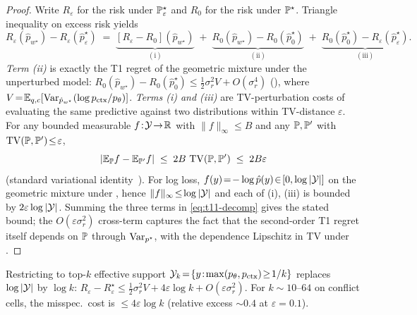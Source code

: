 \begin{proof}
Write $R_\varepsilon$ for the risk under $\mathbb{P}^\star_\varepsilon$ and
$R_0$ for the risk under $\mathbb{P}^\star$.  Triangle inequality on excess
risk yields
\begin{equation}
R_\varepsilon(\hat p_{w^\star})\!-\!R_\varepsilon(\hat p^\star_\varepsilon)
\;=\;\underbrace{[R_\varepsilon\!-\!R_0](\hat p_{w^\star})}_{(\textrm{i})}
\;+\;\underbrace{R_0(\hat p_{w^\star})\!-\!R_0(\hat p^\star_0)}_{(\textrm{ii})}
\;+\;\underbrace{R_0(\hat p^\star_0)\!-\!R_\varepsilon(\hat p^\star_\varepsilon)}_{(\textrm{iii})}.
\label{eq:t11-decomp}
\end{equation}
\emph{Term (ii)} is exactly the T1 regret of the geometric mixture
under the unperturbed model:
$R_0(\hat p_{w^\star})\!-\!R_0(\hat p^\star_0)\!\le\!\tfrac12\sigma_r^{2}V\!+\!O(\sigma_r^{4})$
(), where
$V\!=\!\mathbb{E}_{q,c}[\operatorname{Var}_{\hat p_{w^\star}}(\log p_{\mathrm{ctx}}/p_\theta)]$.
\emph{Terms (i) and (iii)} are TV-perturbation costs of evaluating
the same predictive against two distributions within TV-distance
$\varepsilon$.  For any bounded measurable $f\!:\!\mathcal{Y}\!\to\!\mathbb{R}$
with $\|f\|_\infty\!\le\!B$ and any $\mathbb{P}, \mathbb{P}'$ with
$\operatorname{TV}(\mathbb{P},\mathbb{P}')\!\le\!\varepsilon$,
\begin{equation}
|\mathbb{E}_{\mathbb{P}} f - \mathbb{E}_{\mathbb{P}'} f|\;\le\; 2B\,\operatorname{TV}(\mathbb{P},\mathbb{P}')\;\le\;2B\varepsilon
\label{eq:tv-fluct}
\end{equation}
(standard variational identity~\citep[Lemma 2.4]{tsybakov2009nonparametric}).
For log loss, $f(y)\!=\!-\log\hat p(y)\!\in\![0,\log|\mathcal{Y}|]$ on the
geometric mixture under , hence
$\|f\|_\infty\!\le\!\log|\mathcal{Y}|$ and each of (i), (iii) is bounded by
$2\varepsilon\log|\mathcal{Y}|$.  Summing the three terms in \eqref{eq:t11-decomp}
gives the stated bound; the $O(\varepsilon\sigma_r^{2})$ cross-term
captures the fact that the second-order T1 regret itself depends on
$\mathbb{P}$ through $\operatorname{Var}_{p^\star}$, with the dependence Lipschitz in TV
under .
\end{proof}

\begin{corollary}
\label{cor:t11-topk}
Restricting to top-$k$ effective support
$\mathcal{Y}_k\!=\!\{y\!:\!\max(p_\theta,p_{\mathrm{ctx}})\!\ge\!1/k\}$ replaces
$\log|\mathcal{Y}|$ by $\log k$:
$R_\varepsilon\!-\!R_\varepsilon^\star\!\le\!\tfrac12\sigma_r^{2}V\!+\!4\varepsilon\log k\!+\!O(\varepsilon\sigma_r^{2})$.
For $k\!\sim\!10$--$64$ on conflict cells, the misspec.\ cost is
$\le\!4\varepsilon\log k$ (relative excess
$\sim\!0.4$ at $\varepsilon\!=\!0.1$).
\end{corollary}

